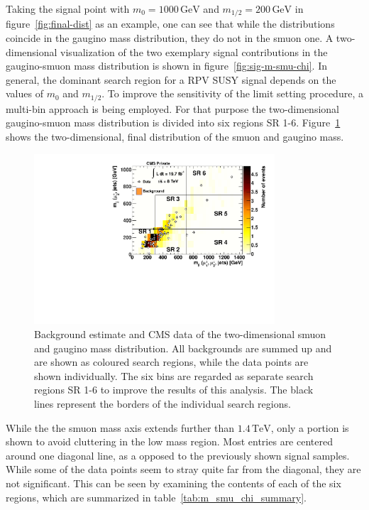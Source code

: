 Taking the signal point with $m_0 = 1000\,\text{GeV}$ and $m_{1/2} = 200\,\text{GeV}$ in figure~\ref{fig:final-dist} as an example, one can see that while the distributions coincide in the gaugino mass distribution, they do not in the smuon one. A two-dimensional visualization of the two exemplary signal contributions in the gaugino-smuon mass distribution is shown in figure~\ref{fig:sig-m-smu-chi}. In general, the dominant search region for a RPV SUSY signal depends on the values of $m_0$ and $m_{1/2}$. To improve the sensitivity of the limit setting procedure, a multi-bin approach is being employed. For that purpose the two-dimensional gaugino-smuon mass distribution is divided into six regions SR 1-6. Figure~\ref{fig:m_smu_chi} shows the two-dimensional, final distribution of the smuon and gaugino mass.

\begin{figure}[!htb]
  \centering
  \includegraphics[width=0.8\textwidth]{plots/m_smu_chi.pdf}
  \caption{Background estimate and CMS data of the two-dimensional smuon and gaugino mass distribution. All backgrounds are summed up and are shown as coloured search regions, while the data points are shown individually. The six bins are regarded as separate search regions SR 1-6 to improve the results of this analysis. The black lines represent the borders of the individual search regions.}
  \label{fig:m_smu_chi}
\end{figure}

\noindent While the the smuon mass axis extends further than $1.4\,\text{TeV}$, only a portion is shown to avoid cluttering in the low mass region. Most entries are centered around one diagonal line, as a opposed to the previously shown signal samples. While some of the data points seem to stray quite far from the diagonal, they are not significant. This can be seen by examining the contents of each of the six regions, which are summarized in table~\ref{tab:m_smu_chi_summary}.

